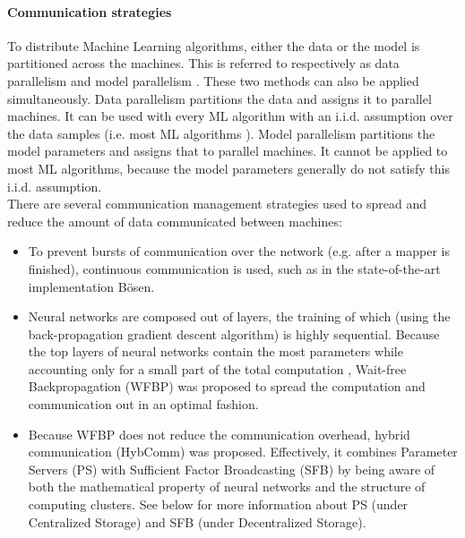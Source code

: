 \paragraph{Communication strategies}
To distribute Machine Learning algorithms, either the data or the model is partitioned across the machines. This is referred to respectively as data parallelism and model parallelism \cite{Die12}. These two methods can also be applied simultaneously\cite{Xing16}. Data parallelism partitions the data and assigns it to parallel machines. It can be used with every ML algorithm with an i.i.d. assumption over the data samples (i.e. most ML algorithms \cite{Xing16}). Model parallelism partitions the model parameters and assigns that to parallel machines. It cannot be applied to most ML algorithms, because the model parameters generally do not satisfy this i.i.d. assumption.\\
There are several communication management strategies\cite{Xing16} used to spread and reduce the amount of data communicated between machines:
\begin{itemize}
	\item To prevent bursts of communication over the network (e.g. after a mapper is finished), continuous communication is used, such as in the state-of-the-art implementation B\"osen\cite{Wei15}.
	
	\item Neural networks are composed out of layers, the training of which (using the back-propagation gradient descent algorithm) is highly sequential. Because the top layers of neural networks contain the most parameters while accounting only for a small part of the total computation \cite{Xing16}, Wait-free Backpropagation (WFBP) \cite{Zhang17} was proposed to spread the computation and communication out in an optimal fashion.
	
	\item Because WFBP does not reduce the communication overhead, hybrid communication (HybComm) \cite{Zhang17} was proposed. Effectively, it combines Parameter Servers (PS)\cite{Wei15} with Sufficient Factor Broadcasting (SFB)\cite{Xie15} by being aware of both the mathematical property of neural networks and the structure of computing clusters. See below for more information about PS (under Centralized Storage) and SFB (under Decentralized Storage).
	
\end{itemize}


